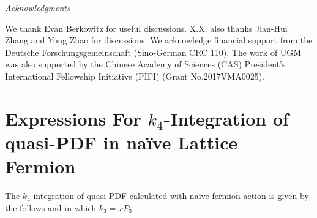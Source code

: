 \documentclass[english,preprint,aps,prd,showpacs,superscriptaddress,nofootinbib,tightenlines]{revtex4}
\begin{document}
\vspace{0.3 cm}
{\noindent \it Acknowledgments}

We thank Evan Berkowitz for useful discussions. X.X. also thanks Jian-Hui Zhang and Yong Zhao for discussions. We acknowledge financial support from the Deutsche Forschungsgemeinschaft (Sino-German CRC 110). The work of UGM was also supported by the Chinese Academy of Sciences (CAS) President's International Fellowship Initiative (PIFI) (Grant No.2017VMA0025).

\allowdisplaybreaks[1]

\appendix
\section{Expressions For $k_4$-Integration of quasi-PDF in na\"ive Lattice Fermion}\label{Oa0_k4_intgrtn_exprsn}
The $k_4$-integration of quasi-PDF calculated with na\"ive fermion action is given by the follows and in which $k_3=xP_3$
\end{document}
